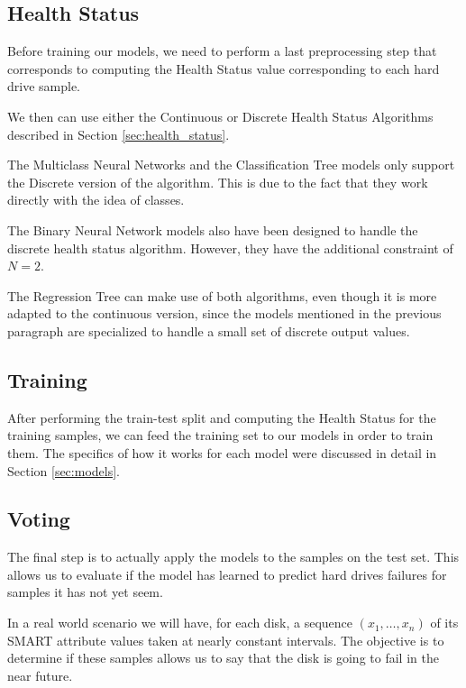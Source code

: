 \subsection{Health Status}\label{subsec:health_status}

Before training our models, we need to perform a last preprocessing step that corresponds to computing the Health Status value corresponding to each hard drive sample.

We then can use either the Continuous or Discrete Health Status Algorithms described in Section \ref{sec:health_status}.

The Multiclass Neural Networks and the Classification Tree models only support the Discrete version of the algorithm.
This is due to the fact that they work directly with the idea of classes.

The Binary Neural Network models also have been designed to handle the discrete health status algorithm.
However, they have the additional constraint of $N = 2$.

The Regression Tree can make use of both algorithms, even though it is more adapted to the continuous version, since the models mentioned in the previous paragraph are specialized to handle a small set of discrete output values.

\subsection{Training}

After performing the train-test split and computing the Health Status for the training samples, we can feed the training set to our models in order to train them.
The specifics of how it works for each model were discussed in detail in Section \ref{sec:models}.

\subsection{Voting}\label{subsec:voting}

The final step is to actually apply the models to the samples on the test set.
This allows us to evaluate if the model has learned to predict hard drives failures for samples it has not yet seem.

In a real world scenario we will have, for each disk, a sequence $(x_1,\dots,x_n)$ of its SMART attribute values taken at nearly constant intervals.
The objective is to determine if these samples allows us to say that the disk is going to fail in the near future.

